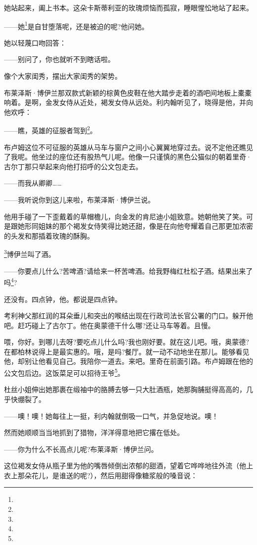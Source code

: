 \par 她站起来，阖上书本。这朵卡斯蒂利亚的玫瑰烦恼而孤寂，睡眼惺忪地站了起来。
\par ——她\footnote{}是自甘堕落呢，还是被迫的呢?他问她。
\par 她以轻蔑口吻回答：
\par ——别问了，你也就听不到瞎话啦。
\par 像个大家闺秀，摆出大家闺秀的架势。
\par 布莱泽斯·博伊兰那双款式新颖的棕黄色皮鞋在他大踏步走着的酒吧间地板上橐橐响着。是啊，金发女侍从近处，褐发女侍从远处。利内翰听见了，晓得是他，并向他欢呼：
\par ——瞧，英雄的征服者驾到\footnote{}。
\par 布卢姆这位不可征服的英雄从马车与窗户之间小心翼翼地穿过去。说不定他还瞧见了我呢。他坐过的座位还有股热气儿呢。他像一只谨慎的黑色公猫似的朝着里奇·古尔丁那只举起来向他打招呼的公文包走去。
\par ——而我从卿卿……
\par ——我听说你到这儿来啦，布莱泽斯·博伊兰说。
\par 他用手碰了一下歪戴着的草帽檐儿，向金发的肯尼迪小姐致意。她朝他笑了笑。可是跟她形同姐妹的那个褐发女侍笑得比她还甜，像是在向他夸耀着自己那更加浓密的头发和那插着玫瑰的酥胸。
\par [潇洒的]\footnote{}博伊兰叫了酒。
\par ——你要点儿什么?苦啤酒?请给来一杯苦啤酒。给我野梅红杜松子酒。结果出来了吗\footnote{}?
\par 还没有。四点钟，他。都说是四点钟。
\par 考利神父那红润的耳朵垂儿和突出的喉结出现在行政司法长官公署的门口。躲开他吧。赶巧碰上了古尔丁。他在奥蒙德干什么哪?还让马车等着。且慢。
\par 喂，你好。到哪儿去呀?要吃点儿什么吗?我也刚好要。就在这儿吧。哦，奥蒙德?在都柏林说得上是最实惠的。哦，是吗?餐厅。就一动不动地坐在那儿。能够看见他，却别让他看见自己。我陪你一道去。来吧。里奇在前面引路。布卢姆跟在他的公文包后边。这饭菜足可以招待王爷\footnote{}。
\par 杜丝小姐伸出她那裹在缎袖中的胳膊去够一只大肚酒瓶，她那胸脯挺得高高的，几乎快绷裂了。
\par ——噢！噢！她每往上一挺，利内翰就倒吸一口气，并急促地说。噢！
\par 然而她顺顺当当地抓到了猎物，洋洋得意地把它撂在低处。
\par ——你为什么不长高点儿呢?布莱泽斯·博伊兰问。
\par 这位褐发女侍从瓶子里为他的嘴唇倾倒出浓郁的甜酒，望着它哗哗地往外流（他上衣上那朵花儿，是谁送的呢?），然后用甜得像糖浆般的嗓音说：
